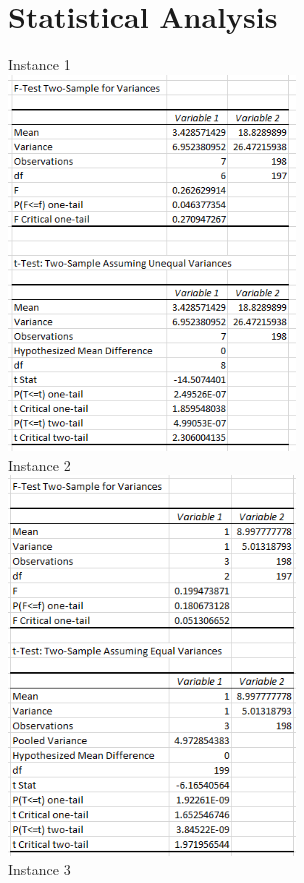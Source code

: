 \documentclass[11pt]{article}
\begin{document}
\newpage \section{Statistical Analysis}
\begin{center}
Instance 1\\
\includegraphics[width=3in]{stat_anal_1.png}\\
Instance 2\\
\includegraphics[width=3in]{stat_anal_2.png}\\
\newpage Instance 3\\

\end{center}
\end{document}
